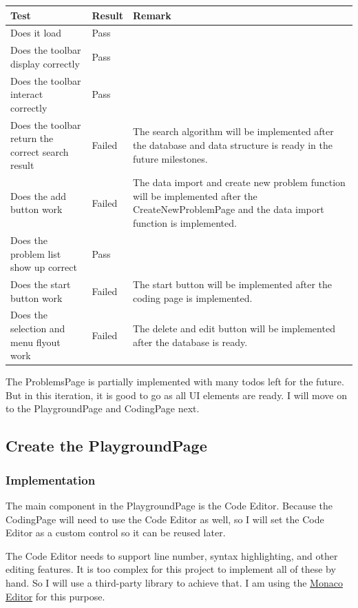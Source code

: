 \documentclass[a4paper]{report}
\begin{document}
\begin{tabulary}{\linewidth}{|L|l|L|}
    \hline
    Test & Result & Remark \\
    \hline
    Does it load & Pass & \\
    \hline
    Does the toolbar display correctly & Pass & \\
    \hline
    Does the toolbar interact correctly & Pass & \\
    \hline
    Does the toolbar return the correct search result & Failed & The search algorithm will be implemented after the database and data structure is ready in the future milestones. \\
    \hline
    Does the add button work & Failed & The data import and create new problem function will be implemented after the CreateNewProblemPage and the data import function is implemented. \\
    \hline
    Does the problem list show up correct & Pass & \\
    \hline
    Does the start button work & Failed & The start button will be implemented after the coding page is implemented. \\
    \hline
    Does the selection and menu flyout work & Failed & The delete and edit button will be implemented after the database is ready. \\
    \hline
\end{tabulary}

The ProblemsPage is partially implemented with many todos left for the future. But in this iteration, it is good to go as all UI elements are ready. I will move on to the PlaygroundPage and CodingPage next.

\subsection{Create the PlaygroundPage}

\subsubsection{Implementation}

The main component in the PlaygroundPage is the Code Editor. Because the CodingPage will need to use the Code Editor as well, so I will set the Code Editor as a custom control so it can be reused later.

The Code Editor needs to support line number, syntax highlighting, and other editing features. It is too complex for this project to implement all of these by hand. So I will use a third-party library to achieve that. I am using the \href{https://microsoft.github.io/monaco-editor/}{Monaco Editor} for this purpose.
\end{document}
